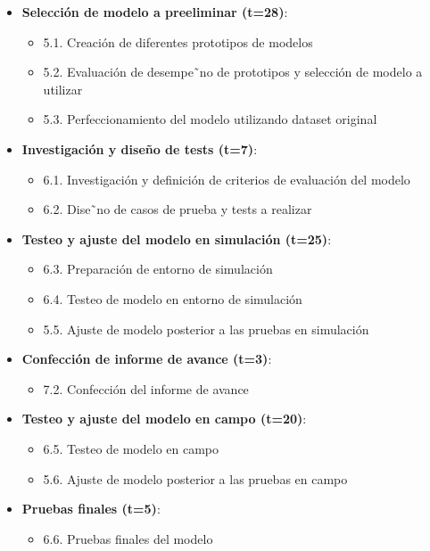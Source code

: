 \documentclass[
11pt, %
codirector, %
]{charter}
\begin{document}
\begin{itemize}
\item \textbf{Selección de modelo a preeliminar (t=28)}:
\begin{itemize}
\item 5.1. Creación de diferentes prototipos de modelos
\item 5.2. Evaluación de desempe˜no de prototipos y selección de modelo a utilizar
\item 5.3. Perfeccionamiento del modelo utilizando dataset original
\end{itemize}

\item \textbf{Investigación y diseño de tests (t=7)}:
\begin{itemize}
\item 6.1. Investigación y definición de criterios de evaluación del modelo
\item 6.2. Dise˜no de casos de prueba y tests a realizar
\end{itemize}

\item \textbf{Testeo y ajuste del modelo en simulación (t=25)}:
\begin{itemize}
\item 6.3. Preparación de entorno de simulación
\item 6.4. Testeo de modelo en entorno de simulación
\item 5.5. Ajuste de modelo posterior a las pruebas en simulación
\end{itemize}

\item \textbf{Confección de informe de avance (t=3)}:
\begin{itemize}
\item 7.2. Confección del informe de avance
\end{itemize}

\item \textbf{Testeo y ajuste del modelo en campo (t=20)}:
\begin{itemize}
\item 6.5. Testeo de modelo en campo
\item 5.6. Ajuste de modelo posterior a las pruebas en campo
\end{itemize}

\item \textbf{Pruebas finales (t=5)}:
\begin{itemize}
\item 6.6. Pruebas finales del modelo
\end{itemize}


\end{itemize}
\end{document}
